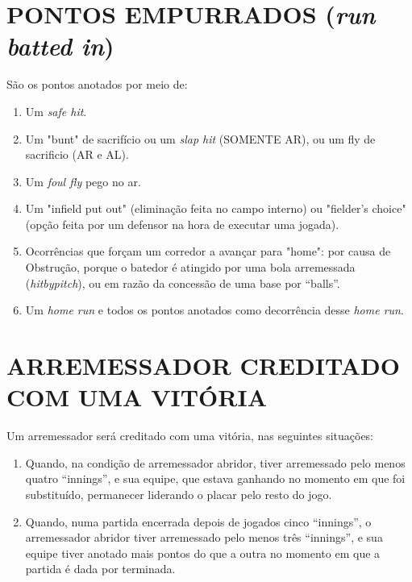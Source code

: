 \section{PONTOS EMPURRADOS (\textit{run batted in}) }
\begin{multicols}{2} 
	São os pontos anotados por meio de: 
	
	\begin{enumerate}[label=\alph*)]
		\item Um \textit{safe hit}. 
		
		\item  Um "bunt" de sacrifício ou um \textit{slap hit} (SOMENTE AR), ou um \gls{fly de sacrificio} (AR e AL). 
		
		\item  Um \textit{foul fly} pego no ar.
		\item Um "infield put out" (eliminação feita no campo interno) ou "fielder's choice" 
		(opção feita por um defensor na hora de executar uma jogada). 
		
		\item  Ocorrências que forçam um corredor a avançar para "home": por causa de 
		Obstrução, porque o batedor é atingido por uma bola arremessada (\textit{hitbypitch}), ou 
		em razão da concessão de uma base por “balls”. 
		
		\item  Um \textit{home run} e todos os pontos anotados como decorrência desse \textit{home run}. 
	\end{enumerate}
\end{multicols}
\section{ARREMESSADOR CREDITADO COM UMA VITÓRIA }
\begin{multicols}{2} 
	Um arremessador será creditado com uma vitória, nas seguintes situações: 
	
	\begin{enumerate}[label=\alph*)]
		\item Quando, na condição de arremessador abridor, tiver arremessado pelo menos 
		quatro “innings”, e sua equipe, que estava ganhando no momento em que foi 
		substituído, permanecer liderando o placar pelo resto do jogo. 
		
		\item  Quando, numa partida encerrada depois de jogados cinco “innings”, o arremessador 
		abridor tiver arremessado pelo menos três “innings”, e sua equipe tiver anotado mais 
		pontos do que a outra no momento em que a partida é dada por terminada. 
	\end{enumerate}
\end{multicols}
